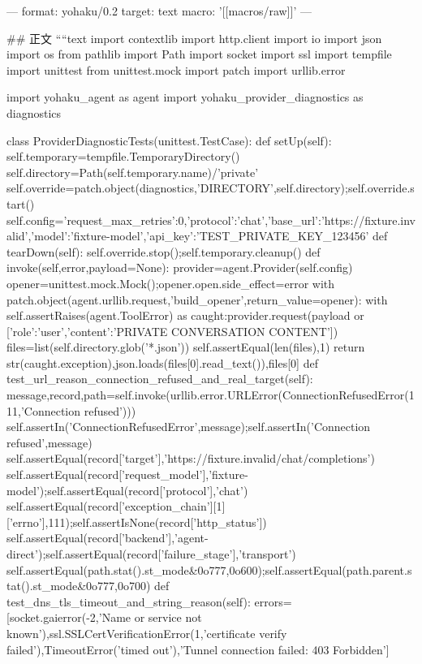 ---
format: yohaku/0.2
target: text
macro: '[[macros/raw]]'
---

## 正文
````text
import contextlib
import http.client
import io
import json
import os
from pathlib import Path
import socket
import ssl
import tempfile
import unittest
from unittest.mock import patch
import urllib.error

import yohaku_agent as agent
import yohaku_provider_diagnostics as diagnostics


class ProviderDiagnosticTests(unittest.TestCase):
    def setUp(self):
        self.temporary=tempfile.TemporaryDirectory()
        self.directory=Path(self.temporary.name)/'private'
        self.override=patch.object(diagnostics,'DIRECTORY',self.directory);self.override.start()
        self.config={'request_max_retries':0,'protocol':'chat','base_url':'https://fixture.invalid','model':'fixture-model','api_key':'TEST_PRIVATE_KEY_123456'}
    def tearDown(self):
        self.override.stop();self.temporary.cleanup()
    def invoke(self,error,payload=None):
        provider=agent.Provider(self.config)
        opener=unittest.mock.Mock();opener.open.side_effect=error
        with patch.object(agent.urllib.request,'build_opener',return_value=opener):
            with self.assertRaises(agent.ToolError) as caught:provider.request(payload or [{'role':'user','content':'PRIVATE CONVERSATION CONTENT'}])
        files=list(self.directory.glob('*.json'))
        self.assertEqual(len(files),1)
        return str(caught.exception),json.loads(files[0].read_text()),files[0]
    def test_url_reason_connection_refused_and_real_target(self):
        message,record,path=self.invoke(urllib.error.URLError(ConnectionRefusedError(111,'Connection refused')))
        self.assertIn('ConnectionRefusedError',message);self.assertIn('Connection refused',message)
        self.assertEqual(record['target'],'https://fixture.invalid/chat/completions')
        self.assertEqual(record['request_model'],'fixture-model');self.assertEqual(record['protocol'],'chat')
        self.assertEqual(record['exception_chain'][1]['errno'],111);self.assertIsNone(record['http_status'])
        self.assertEqual(record['backend'],'agent-direct');self.assertEqual(record['failure_stage'],'transport')
        self.assertEqual(path.stat().st_mode&0o777,0o600);self.assertEqual(path.parent.stat().st_mode&0o777,0o700)
    def test_dns_tls_timeout_and_string_reason(self):
        errors=[socket.gaierror(-2,'Name or service not known'),ssl.SSLCertVerificationError(1,'certificate verify failed'),TimeoutError('timed out'),'Tunnel connection failed: 403 Forbidden']
